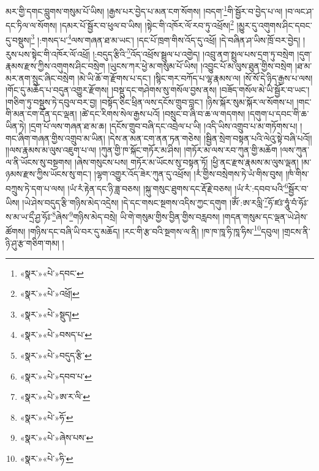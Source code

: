 མར་གྱི་དགང་བླུགས་གསུམ་པོ་ཡིས། །རྒྱས་པར་བྱེད་པ་མན་ངག་སོགས། །བདག་\footnote{«སྣར་»«པེ་»དབང་}གི་སྦྱོར་བ་བྱེད་པ་ལ། །བ་ལང་ཤ་དང་ཏིལ་ལ་སོགས། །དམར་པོ་སྦྱོར་བ་ཕུལ་བ་ཡིས། །སྟེང་གི་འཁོར་ལོ་རབ་ཏུ་འཕྲོས།\footnote{«སྣར་»«པེ་»འཕྲོ།} །མྱུར་དུ་འགུགས་ཤིང་དབང་དུ་བསྡུས།\footnote{«སྣར་»«པེ་»སྡུད།} །:གསད་པ་\footnote{«སྣར་»«པེ་»བསད་པ་}ལས་གཞན་ཐ་མ་ཡང་། །དང་པོ་ཁྲག་གིས་འོད་དུ་འཕྲོ། །དེ་བཞིན་ཤ་ཡིས་ཁྲོ་བར་བྱེད། །རུས་པས་སྟེང་གི་འཁོར་ལོ་འཕྲོ། །:བདུད་རྩིའི་\footnote{«སྣར་»«པེ་»བདུད་རྩི་}འོད་འཕྲོས་སྦྲུལ་པ་འགྱེད། །འབྲུ་ནག་སྤྲུལ་པས་དྲག་ཏུ་བསྲེག །དུག་རྣམས་རྫས་ཀྱིས་འགུགས་ཤིང་བསྲེག །ཡུངས་ཀར་ཕྱེ་མ་གསུམ་པོ་ཡིས། །འབྱུང་པོ་མ་ལུས་ཐུན་གྱིས་བསྲེག །ཐ་མ་མར་ནག་སྲུང་ཞིང་བསྲེག །མེ་ཡི་ཆོ་ག་རྫོགས་པ་དང་། །སྙིང་གར་བཀོད་པ་ལྷ་རྣམས་ལ། །སོ་སོ་དེ་ཉིད་རྒྱས་པ་ལས། །གོང་དུ་མཆོད་པ་བདུན་འགྱུར་རྫོགས། །བསྡུ་དང་གཤེགས་སུ་གསོལ་བྱས་ནས། །བཟོད་གསོལ་མེ་ཡི་སྦྱོར་བ་ཡང་། །གཅིག་ཏུ་བསྡུས་ཏེ་དབུལ་བར་བྱ། །བསྟོད་ཅིང་ཕྲིན་ལས་དངོས་གྲུབ་བླང་། །ཉིས་སྐོར་སུམ་སྐོར་ལ་སོགས་པ། །གང་གི་མན་ངག་དོན་དང་ལྡན། །ཚེ་དང་རིགས་སེལ་རྒྱས་པའོ། །བསྲུང་བ་ཞི་བ་ཆ་ལ་གདགས། །དགུག་པ་དབང་གི་ཆ་ཡིན་ཏེ། །དྲག་པོ་ལས་གཞན་ཐ་མ་ཆ། །དངོས་གྲུབ་བཞི་དང་འབྲེལ་པ་ཡི། །འདི་ཡིས་འགྲུབ་པ་མ་གཏོགས་པ། །གང་ཞིག་གཞན་གྱིས་འགྲུབ་མ་ཡིན། །དེས་ན་མན་ངག་ནན་ཏན་གཅེས། །སྦྱིན་སྲེག་བསྟན་པའི་ལེའུ་སྟེ་བཞི་པའོ།། །།ལས་རྣམས་མ་ལུས་འཇུག་པ་ལ། །ཀུན་གྱི་ཁ་སྐོང་གཏོར་མ་ཤིས། །གཏོར་མ་ལས་རབ་ཀུན་གྱི་མཆོག །ལས་ཀུན་ལ་ནི་ཡོངས་སུ་བསྔགས། །ཞེས་གསུངས་པས། གཏོར་མ་ཡོངས་སུ་བསྟན་ཏོ། །ཕྱི་ནང་རྫས་རྣམས་མ་ལུས་ལྡན། །མ་ཉམས་རྫས་ཀྱིས་ཡོངས་སུ་གང་། །ལྷག་འགྱུར་འོད་ཟེར་ཀུན་དུ་འཕྲོས། །རཾ་གྱིས་བསྲེགས་ཏེ་ཡཾ་གིས་བུས། །ཁཾ་གིས་བཀྲུས་ཏེ་དག་པ་ལས། །ཡཾ་རཾ་རྟེན་དང་ཉི་ཟླ་བཅས། །སྐུ་གསུང་ཐུགས་དང་རྡོ་རྗེ་བཅས། །ཡཾ་རཾ་:དབབ་པའི་\footnote{«སྣར་»«པེ་»དབབ་པ་}སྦྱོར་བ་ཡིས། །ཡེ་ཤེས་བདུད་རྩི་གཉིས་མེད་འདྲེས། །དེ་དང་གསང་སྔགས་འདིས་ཀྱང་དགུག །ཨོཾ་:ཨ་རལླི་\footnote{«སྣར་»«པེ་»ཨ་ར་ལི་}ཧོ་ཛཿ་ཧཱུཾ་བཾ་ཧོཿ་ས་མ་ཡ་དྲྀ་ཤྱ་ཧོཿ་\footnote{«སྣར་»«པེ་»ཧོ་}ཞེས་\footnote{«སྣར་»«པེ་»ཞེས་པས་}གཉིས་མེད་བསྲེ། ཡི་གེ་གསུམ་གྱིས་བྱིན་གྱིས་བརླབས། །གདན་གསུམ་དང་ལྡན་ཡེ་ཤེས་ཚོགས། །གཉིས་དང་བཞི་ཡི་བར་དུ་མཆོད། །རང་གི་རྩ་བའི་སྔགས་ལ་ནི། །ཁ་ཁ་ཁཱ་ཧི་ཁཱ་ཧིས་\footnote{«སྣར་»«པེ་»ཧི་}དབུལ། །གྲངས་ནི་ཉི་ཤུ་རྩ་གཅིག་གམ། །
